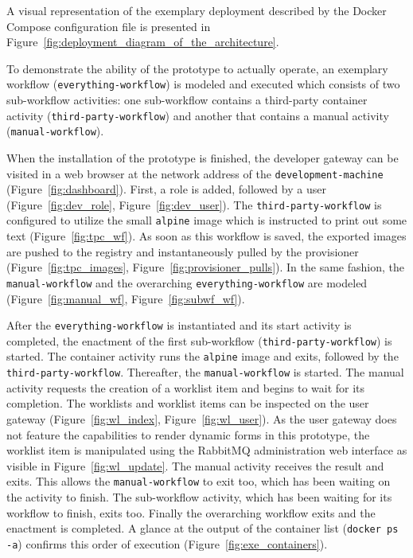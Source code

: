   A visual representation of the exemplary deployment described by the Docker Compose configuration file is presented in Figure~\ref{fig:deployment_diagram_of_the_architecture}.

  To demonstrate the ability of the prototype to actually operate, an exemplary workflow (\texttt{everything-workflow}) is modeled and executed which consists of two sub-workflow activities: one sub-workflow contains a third-party container activity (\texttt{third-party-workflow}) and another that contains a manual activity (\texttt{manual-workflow}).

  When the installation of the prototype is finished, the developer gateway can be visited in a web browser at the network address of the \texttt{development-machine} (Figure~\ref{fig:dashboard}). First, a role is added, followed by a user (Figure~\ref{fig:dev_role}, Figure~\ref{fig:dev_user}). The \texttt{third-party-workflow} is configured to utilize the small \texttt{alpine} image which is instructed to print out some text (Figure~\ref{fig:tpc_wf}). As soon as this workflow is saved, the exported images are pushed to the registry and instantaneously pulled by the provisioner (Figure~\ref{fig:tpc_images}, Figure~\ref{fig:provisioner_pulls}). In the same fashion, the \texttt{manual-workflow} and the overarching \texttt{everything-workflow} are modeled (Figure~\ref{fig:manual_wf}, Figure~\ref{fig:subwf_wf}).

  After the \texttt{everything-workflow} is instantiated and its start activity is completed, the enactment of the first sub-workflow (\texttt{third-party-workflow}) is started. The container activity runs the \texttt{alpine} image and exits, followed by the \texttt{third-party-workflow}. Thereafter, the \texttt{manual-workflow} is started. The manual activity requests the creation of a worklist item and begins to wait for its completion. The worklists and worklist items can be inspected on the user gateway (Figure~\ref{fig:wl_index}, Figure~\ref{fig:wl_user}). As the user gateway does not feature the capabilities to render dynamic forms in this prototype, the worklist item is manipulated using the RabbitMQ administration web interface as visible in Figure~\ref{fig:wl_update}. The manual activity receives the result and exits. This allows the \texttt{manual-workflow} to exit too, which has been waiting on the activity to finish. The sub-workflow activity, which has been waiting for its workflow to finish, exits too. Finally the overarching workflow exits and the enactment is completed. A glance at the output of the container list (\texttt{docker ps -a}) confirms this order of execution (Figure~\ref{fig:exe_containers}).

